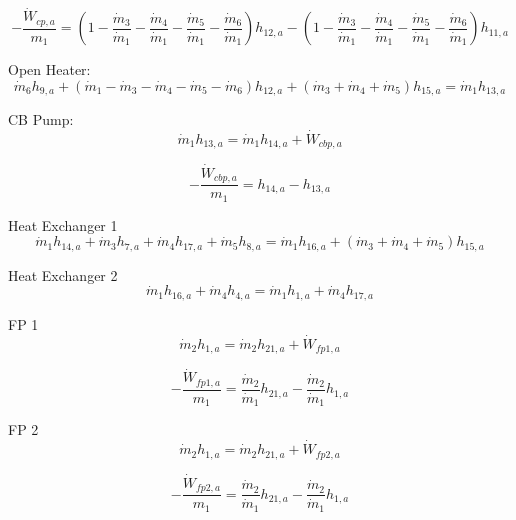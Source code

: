 \documentclass{article}
\begin{document}
\begin{equation}
-\frac{\dot{W}_{cp ,a}}{m_1} = (1 - \frac{\dot{m}_{ 3}}{\dot{m}_{ 1}} - \frac{\dot{m}_{ 4}}{\dot{m}_{ 1}} - \frac{\dot{m}_{ 5}}{\dot{m}_{ 1}} - \frac{\dot{m}_{ 6}}{\dot{m}_{ 1}})h_{12,a} - (1 - \frac{\dot{m}_{ 3}}{\dot{m}_{ 1}} - \frac{\dot{m}_{ 4}}{\dot{m}_{ 1}} - \frac{\dot{m}_{ 5}}{\dot{m}_{ 1}} - \frac{\dot{m}_{ 6}}{\dot{m}_{ 1}})h_{11,a}
\end{equation}


Open Heater:
\begin{equation}
\dot{m}_{ 6}h_{ 9,a} + (\dot{m}_{ 1} - \dot{m}_{ 3} - \dot{m}_{ 4} - \dot{m}_{ 5} - \dot{m}_{ 6})h_{12,a} + (\dot{m}_{ 3} + \dot{m}_{ 4} + \dot{m}_{ 5})h_{15,a} = \dot{m}_{ 1}h_{13,a}
\end{equation}


CB Pump:
\begin{equation}
\dot{m}_{ 1}h_{13,a} = \dot{m}_{ 1}h_{14,a} + \dot{W}_{cbp,a}
\end{equation}

\begin{equation}
-\frac{\dot{W}_{cbp,a}}{m_1} = h_{14,a} - h_{13,a}
\end{equation}


Heat Exchanger 1
\begin{equation}
\dot{m}_{ 1}h_{14,a} + \dot{m}_{ 3}h_{ 7,a} + \dot{m}_{ 4}h_{17,a} + \dot{m}_{ 5}h_{ 8,a} = \dot{m}_{ 1}h_{16,a} + (\dot{m}_{ 3} + \dot{m}_{ 4} + \dot{m}_{ 5})h_{15,a}
\end{equation}


Heat Exchanger 2
\begin{equation}
\dot{m}_{ 1}h_{16,a} + \dot{m}_{ 4}h_{ 4,a} = \dot{m}_{ 1}h_{ 1,a} + \dot{m}_{ 4}h_{17,a}
\end{equation}


FP 1
\begin{equation}
\dot{m}_{ 2}h_{ 1,a} = \dot{m}_{ 2}h_{21,a} + \dot{W}_{fp1,a}
\end{equation}

\begin{equation}
-\frac{\dot{W}_{fp1,a}}{m_1} = \frac{\dot{m}_{ 2}}{\dot{m}_{ 1}}h_{21,a} - \frac{\dot{m}_{ 2}}{\dot{m}_{ 1}}h_{ 1,a}
\end{equation}


FP 2
\begin{equation}
\dot{m}_{ 2}h_{ 1,a} = \dot{m}_{ 2}h_{21,a} + \dot{W}_{fp2,a}
\end{equation}

\begin{equation}
-\frac{\dot{W}_{fp2,a}}{m_1} = \frac{\dot{m}_{ 2}}{\dot{m}_{ 1}}h_{21,a} - \frac{\dot{m}_{ 2}}{\dot{m}_{ 1}}h_{ 1,a}
\end{equation}
\end{document}
